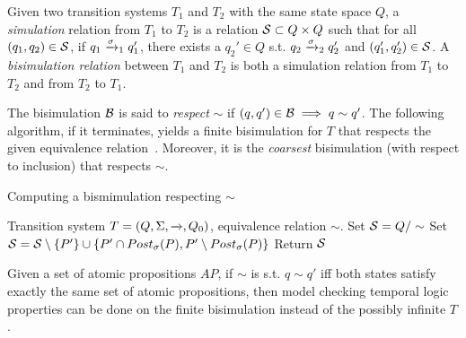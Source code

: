 \begin{defn}
	\label{defn:simulation}	
	Given two transition systems $T_1$ and $T_2$ with the same state space $Q$,
	a \emph{simulation} relation from $T_1$ to $T_2$ is a relation $\mathcal{S} \subset Q \times Q$ such that 
	for all $(q_1,q_2) \in \mathcal{S}$, if $q_1 \xrightarrow{\sigma}_1 q_1'$, there exists a $q_2' \in Q$ s.t. $q_2 \xrightarrow{\sigma}_2 q_2'$ and $(q_1',q_2') \in \mathcal{S}$.
	A \emph{bisimulation relation} between $T_1$ and $T_2$ is both a simulation relation from $T_1$ to $T_2$ and from $T_2$ to $T_1$.
\end{defn}
%
The bisimulation $\mathcal{B}$ is said to \emph{respect} $\sim$ if $(q,q') \in \mathcal{B} \implies q \sim q'$.
%
The following algorithm, if it terminates, yields a finite bisimulation for $T$ that respects the given equivalence relation~\cite{AlurHLP00ieee}.
Moreover, it is the \emph{coarsest} bisimulation (with respect to inclusion) that respects $\sim$.
\begin{algorithm}[t]
		\caption{Computing a bismimulation respecting $\sim$}
		\label{algo:bisimulation}
		\begin{algorithmic}
			\Require Transition system $T = (Q,\Sigma,\xrightarrow{},Q_0)$, equivalence relation $\sim$.
			\State Set $\mathcal{S} = Q/\sim$			
				\State Set $\mathcal{S} = \mathcal{S} \setminus \{P'\} \cup \{P' \cap Post_\sigma(P) , P' \setminus Post_\sigma(P) \}$
			\EndWhile	
			\State Return $\mathcal{S}$
		\end{algorithmic}
\end{algorithm}
Given a set of atomic propositions $AP$, if $\sim$ is s.t. $q \sim q'$ iff both states satisfy exactly the same set of atomic propositions, then model checking temporal logic properties can be done on the finite bisimulation instead of the possibly infinite $T$.



%
